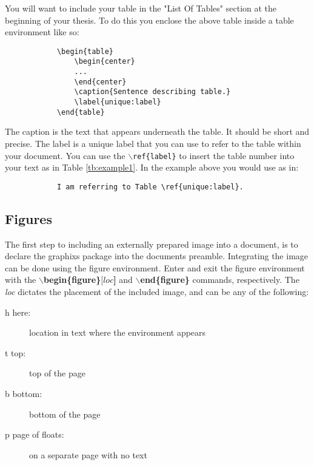 You will want to include your table in the "List Of Tables"
section at the beginning of your thesis. To do this you
enclose the above table inside a table environment like so:

\begin{verbatim}
            \begin{table}
                \begin{center}
                ...
                \end{center}
                \caption{Sentence describing table.}
                \label{unique:label}
            \end{table}
\end{verbatim}

The caption is the text that appears underneath the table. 
It should be short and precise. The label is a unique 
label that you can use to refer to the table within 
your document. You can use the \texttt{$\backslash$ref\{label\}}
to insert the table number into your text as in Table \ref{tb:example1}.
In the example above you would use as in:
\begin{verbatim}
            I am referring to Table \ref{unique:label}.
\end{verbatim}

\subsection{Figures}
 The first step to including an externally prepared image into a document, is to declare the graphixs package into the documents preamble.
 Integrating the image can be done using the figure environment. Enter and exit the figure environment with the \textbf{$\backslash$begin\{figure\}$[loc$]} and \textbf{$\backslash$end\{figure\}} commands, respectively. The \textit{loc} dictates the placement of the included image, and can be any of the following:
 \begin{description}
    \item[h here:] location in text where the environment appears
    \vspace{-2mm}
    \item[t top:]  top of the page
    \vspace{-2mm}
    \item[b bottom:] bottom of the page
    \vspace{-2mm}
    \item[p page of floats:] on a separate page with no text
 \end{description}

